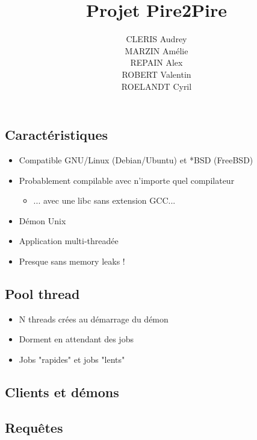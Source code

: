 \documentclass{beamer}
\begin{document}
\title{Projet Pire2Pire}
\author {
CLERIS Audrey        \\
MARZIN Amélie        \\
REPAIN Alex          \\
ROBERT Valentin      \\
ROELANDT Cyril
}


\begin{frame}
    \titlepage
\end{frame}

\begin{frame}
    \section{Caractéristiques}
    \begin{itemize}
        \item Compatible GNU/Linux (Debian/Ubuntu) et *BSD (FreeBSD)
        \item Probablement compilable avec n'importe quel compilateur
        \begin{itemize}
            \item ... avec une libc sans extension GCC...
        \end{itemize}
        \item Démon Unix
        \item Application multi-threadée
        \item Presque sans memory leaks !
    \end{itemize}
\end{frame}

\begin{frame}
    \section{Pool thread}
    \begin{itemize}
        \item N threads crées au démarrage du démon
        \item Dorment en attendant des jobs
        \item Jobs "rapides" et jobs "lents"
    \end{itemize}
\end{frame}

\begin{frame}
    \section{Clients et démons}
\end{frame}

\begin{frame}
    \section{Requêtes}
\end{frame}
\end{document}
